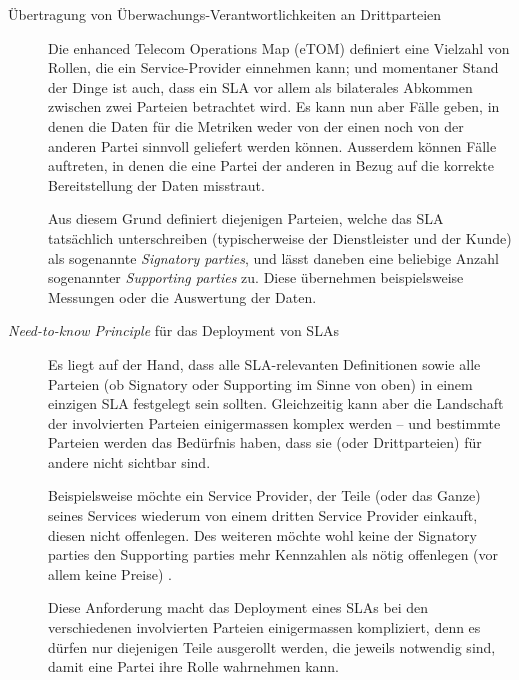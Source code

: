 \documentclass[11pt,listof=totoc]{scrreprt} %
\theoremstyle{definition}
\begin{document}
\begin{description}
\begin{itemize}
\end{itemize}
\item[Übertragung von Überwachungs-Verantwortlichkeiten an Drittparteien]
Die enhanced Telecom Operations Map (eTOM) \cite{ibm:wslaPaper, wiki:etom} definiert eine Vielzahl von Rollen, die ein Service-Provider einnehmen kann; und momentaner Stand der Dinge ist auch, dass ein SLA vor allem als bilaterales Abkommen zwischen zwei Parteien betrachtet wird. Es kann nun aber Fälle geben, in denen die Daten für die Metriken weder von der einen noch von der anderen Partei sinnvoll geliefert werden können. Ausserdem können Fälle auftreten, in denen die eine Partei der anderen in Bezug auf die korrekte Bereitstellung der Daten misstraut.

Aus diesem Grund definiert \cite{ibm:wslaPaper} diejenigen Parteien, welche das SLA tatsächlich unterschreiben (typischerweise der Dienstleister und der Kunde) als sogenannte {\em Signatory parties}, und lässt daneben eine beliebige Anzahl sogenannter {\em Supporting parties} zu. Diese übernehmen beispielsweise Messungen oder die Auswertung der Daten.
\item[{\em Need-to-know Principle} für das Deployment von SLAs]
Es liegt auf der Hand, dass alle SLA-relevanten Definitionen sowie alle Parteien (ob Signatory oder Supporting im Sinne von oben) in einem einzigen SLA festgelegt sein sollten. Gleichzeitig kann aber die Landschaft der involvierten Parteien einigermassen komplex werden -- und bestimmte Parteien werden das Bedürfnis haben, dass sie (oder Drittparteien) für andere nicht sichtbar sind.

Beispielsweise möchte ein Service Provider, der Teile (oder das Ganze) seines Services wiederum von einem dritten Service Provider einkauft, diesen nicht offenlegen. Des weiteren möchte wohl keine der Signatory parties den Supporting parties mehr Kennzahlen als nötig offenlegen (vor allem keine Preise) \cite{ibm:wslaPaper}.

Diese Anforderung macht das Deployment eines SLAs bei den verschiedenen involvierten Parteien einigermassen kompliziert, denn es dürfen nur diejenigen Teile ausgerollt werden, die jeweils notwendig sind, damit eine Partei ihre Rolle wahrnehmen kann.


\end{description}
\end{document}
